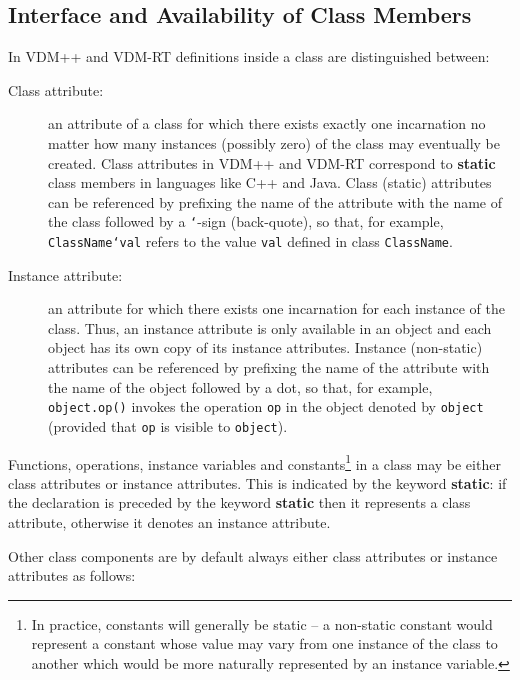\documentclass{overturerepchap}
\newcommand{\keyw}[1]{{\bf\ttfamily #1}}
\begin{document}
{\subsection{Interface and Availability of Class Members}\label{ch:interface}

In VDM++ and VDM-RT definitions inside a class are distinguished between:

\begin{description}
\item[Class attribute:] an attribute of a class for which there
  exists exactly one incarnation no matter how many instances
  (possibly zero) of the class may eventually be created. Class
  attributes in VDM++ and VDM-RT correspond to \keyw{static} class members in
  languages like C++ and Java. Class (static) attributes can be
  referenced by prefixing the name of the attribute with the name of
  the class followed by a \texttt{`}-sign (back-quote), so that, for
  example, {\tt ClassName`val} refers to the value {\tt val} defined in
  class {\tt ClassName}.

\item[Instance attribute:] an attribute for which there exists one
  incarnation for each instance of the class. Thus, an instance
  attribute is only available in an object and each object has its own
  copy of its instance attributes. Instance (non-static) attributes
  can be referenced by prefixing the name of the attribute with the name of
  the object followed by a dot, so that, for example, {\tt
    object.op()} invokes the operation {\tt op} in the object denoted
  by {\tt object} (provided that \texttt{op} is visible to
  \texttt{object}).
\end{description}

Functions, operations, instance variables and constants\footnote{In
  practice, constants will generally be static -- a non-static
  constant would represent a constant whose value may vary from one
  instance of the class to another which would be more naturally
  represented by an instance variable.} in a class may
be either class attributes or instance attributes. This is indicated
by the keyword \keyw{static}: if the declaration is preceded by the
keyword \keyw{static} then it represents a class attribute, otherwise
it denotes an instance attribute.

Other class components are by default always either class attributes
or instance attributes as follows:

}
\end{document}
